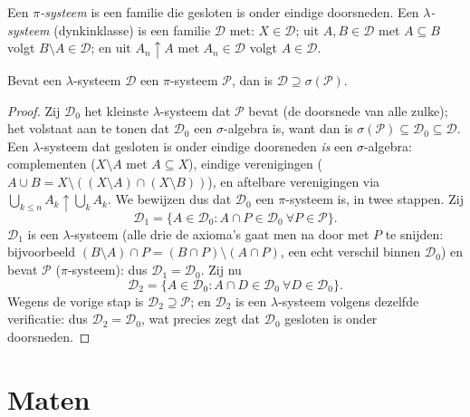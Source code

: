 \begin{definition}\label{def:b3:measure:dynkin}
Een \emph{$\pi$-systeem} is een
familie die gesloten is onder eindige doorsneden. Een
\emph{$\lambda$-systeem}
(dynkinklasse) is een familie $\mathcal D$ met: $X \in \mathcal
D$; uit $A, B \in \mathcal D$ met $A \subseteq B$ volgt $B
\setminus A \in \mathcal D$; en uit $A_n \uparrow A$ met $A_n \in
\mathcal D$ volgt $A \in \mathcal D$.
\end{definition}

\begin{theorem}
\label{thm:b3:measure:dynkin}
Bevat een $\lambda$-systeem $\mathcal D$ een $\pi$-systeem
$\mathcal P$, dan is $\mathcal D \supseteq
\sigma(\mathcal P)$.
\end{theorem}

\begin{proof}
Zij $\mathcal D_0$ het kleinste $\lambda$-systeem dat $\mathcal P$
bevat (de doorsnede van alle zulke); het volstaat aan te tonen dat
$\mathcal D_0$ een $\sigma$-algebra is, want dan is
$\sigma(\mathcal P) \subseteq \mathcal D_0 \subseteq \mathcal D$.
Een $\lambda$-systeem dat gesloten is onder eindige doorsneden
\emph{is} een $\sigma$-algebra: complementen ($X \setminus A$ met
$A \subseteq X$), eindige verenigingen ($A \cup B = X \setminus
((X\setminus A)\cap(X\setminus B))$), en aftelbare verenigingen
via $\bigcup_{k \leq n}A_k \uparrow \bigcup_kA_k$. We bewijzen dus
dat $\mathcal D_0$ een $\pi$-systeem is, in twee stappen. Zij
\[
\mathcal D_1 = \{A \in \mathcal D_0 : A \cap P \in \mathcal
D_0 \ \forall P \in \mathcal P\}.
\]
$\mathcal D_1$ is een $\lambda$-systeem (alle drie de axioma's
gaat men na door met $P$ te snijden: bijvoorbeeld $(B\setminus
A)\cap P = (B \cap P)\setminus(A \cap P)$, een echt verschil
binnen $\mathcal D_0$) en bevat $\mathcal P$ ($\pi$-systeem): dus
$\mathcal D_1 = \mathcal D_0$. Zij nu
\[
\mathcal D_2 = \{A \in \mathcal D_0 : A \cap D \in \mathcal
D_0\ \forall D \in \mathcal D_0\}.
\]
Wegens de vorige stap is $\mathcal D_2 \supseteq \mathcal P$; en
$\mathcal D_2$ is een $\lambda$-systeem volgens dezelfde
verificatie: dus $\mathcal D_2 = \mathcal D_0$, wat precies zegt
dat $\mathcal D_0$ gesloten is onder doorsneden.
\end{proof}

\section{Maten}

